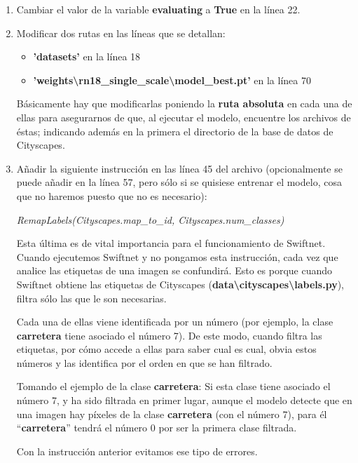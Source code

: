 \begin{enumerate}
\item Cambiar el valor de la variable \textbf{evaluating} a \textbf{True} en la línea 22.
\item Modificar dos rutas en las líneas que se detallan:
\begin{itemize}
\item \textbf{'datasets'} en la línea 18
\item \textbf{'weights\textbackslash{rn18\_single\_scale}\textbackslash{model\_best.pt}'} en la línea 70
\end{itemize}

Básicamente hay que modificarlas poniendo la \textbf{ruta absoluta} en cada una de ellas para asegurarnos de que, al ejecutar el modelo, encuentre los archivos de éstas; indicando además en la primera el directorio de la base de datos de Cityscapes.

\item Añadir la siguiente instrucción en las línea 45 del archivo (opcionalmente se puede añadir en la línea 57, pero sólo si se quisiese entrenar el modelo, cosa que no haremos puesto que no es necesario):

\begin{center}
\textit{RemapLabels(Cityscapes.map\_to\_id, Cityscapes.num\_classes)}
\end{center}

Esta última es de vital importancia para el funcionamiento de Swiftnet. Cuando ejecutemos Swiftnet y no pongamos esta instrucción, cada vez que analice las etiquetas de una imagen se confundirá. Esto es porque cuando Swiftnet obtiene las etiquetas de Cityscapes (\textbf{data\textbackslash{cityscapes}\textbackslash{labels.py}}), filtra sólo las que le son necesarias.

Cada una de ellas viene identificada por un número (por ejemplo, la clase \textbf{carretera} tiene asociado el número 7). De este modo, cuando filtra las etiquetas, por cómo accede a ellas para saber cual es cual, obvia estos números y las identifica por el orden en que se han filtrado.

Tomando el ejemplo de la clase \textbf{carretera}: Si esta clase tiene asociado el número 7, y ha sido filtrada en primer lugar, aunque el modelo detecte que en una imagen hay píxeles de la clase \textbf{carretera} (con el número 7), para él ``\textbf{carretera}'' tendrá el número 0 por ser la primera clase filtrada.

Con la instrucción anterior evitamos ese tipo de errores.
\end{enumerate}

